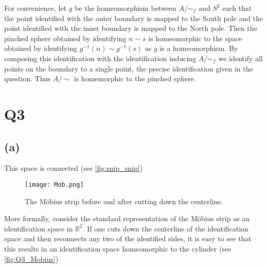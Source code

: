\documentclass{article}
\begin{document}
For convenience, let $g$ be the homeomorphism between $A/ \sim_f$ and $S^2$ such that 
the point identified with the outer boundary is mapped to the South pole and 
the point identified with the inner boundary is mapped to the North pole. Then the pinched 
sphere obtained by identifying $n \sim s$ is homeomorphic to the space obtained by identifying 
$g^{-1}(n) \sim g^{-1}(s)$ as $g$ is a homeomorphism. By composing this identification with 
the identification inducing $A/ \sim_f$ we identify all points on the boundary to a single 
point, the precise identification given in the question. Thus $A / \sim$ is homemorphic 
to the pinched sphere.

\section*{Q3}
\subsection*{(a)}
This space is connected (see \autoref{fig:snip_snip})

\begin{figure}[H]
    \centering
    \begin{turn}{-90}
    \texttt{[image: Mob.png]}
    \end{turn}
	\caption{The M{\"o}bius strip before and after cutting down the centerline.}
	\label{fig:snip_snip}
\end{figure}

More formally, consider the standard representation of the M\"obius strip as an identification 
space in $\mathbb{R}^2$. If one cuts down the centerline of the identification space and 
then reconnects any two of the identified sides, it is easy to see that this results in an 
identification space homeomorphic to the cylinder (see \autoref{fig:Q3_Mobius})
\end{document}
